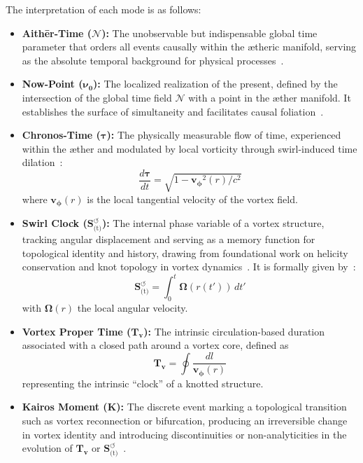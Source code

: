 \noindent The interpretation of each mode is as follows:
\begin{itemize}
    \item \textbf{Aithēr-Time ($\boldsymbol{\mathcal{N}}$):} The unobservable but indispensable global time parameter that orders all events causally within the ætheric manifold, serving as the absolute temporal background for physical processes~\cite{VAM-8, VAM-13}.

    \item \textbf{Now-Point ($\boldsymbol{\nu_0}$):} The localized realization of the present, defined by the intersection of the global time field $\boldsymbol{\mathcal{N}}$ with a point in the æther manifold. It establishes the surface of simultaneity and facilitates causal foliation~\cite{VAM-8, VAM-13}.

    \item \textbf{Chronos-Time ($\boldsymbol{\tau}$):} The physically measurable flow of time, experienced within the æther and modulated by local vorticity through swirl-induced time dilation~\cite{VAM-1, VAM-8}:
    \[
        \frac{d\boldsymbol{\tau}}{dt} = \sqrt{1 - \boldsymbol{v_\phi}^2(r)/c^2}
    \]
    where $\boldsymbol{v_\phi}(r)$ is the local tangential velocity of the vortex field.

    \item \textbf{Swirl Clock ($\boldsymbol{S}^{\boldsymbol{\circlearrowleft}}_\text{(t)}$):} The internal phase variable of a vortex structure, tracking angular displacement and serving as a memory function for topological identity and history, drawing from foundational work on helicity conservation and knot topology in vortex dynamics~\cite{knot_theroy_in_fluid}. It is formally given by~\cite{VAM-2, VAM-13}:
    \[
        \boldsymbol{S}^{\boldsymbol{\circlearrowleft}}_\text{(t)} = \int_{0}^{t} \boldsymbol{\Omega}(r(t'))\, dt'
    \]
    with $\boldsymbol{\Omega}(r)$ the local angular velocity.

    \item \textbf{Vortex Proper Time ($\boldsymbol{T_v}$):} The intrinsic circulation-based duration associated with a closed path around a vortex core, defined as~\cite{VAM-2, VAM-13}
    \[
        \boldsymbol{T_v} = \oint \frac{dl}{\boldsymbol{v_\phi}(r)}
    \]
    representing the intrinsic “clock” of a knotted structure.

    \item \textbf{Kairos Moment ($\mathbb{\boldsymbol{K}}$):}
    The discrete event marking a topological transition such as vortex reconnection or bifurcation, producing an irreversible change in vortex identity and introducing discontinuities or non-analyticities in the evolution of $\boldsymbol{T_v}$ or $\boldsymbol{S}^{\boldsymbol{\circlearrowleft}}_\text{(t)}$~\cite{VAM-13, VAM-15}.
\end{itemize}

